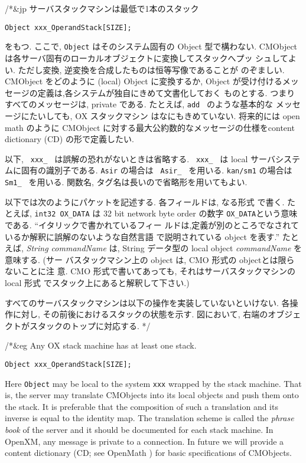 /*&jp
\noindent
サーバスタックマシンは最低で1本のスタック
\begin{verbatim}
Object xxx_OperandStack[SIZE];
\end{verbatim}
をもつ.  ここで, {\tt Object} はそのシステム固有の Object 型で構わない.
CMObject は各サーバ固有のローカルオブジェクトに変換してスタックへプッ
シュしてよい.  ただし変換, 逆変換を合成したものは恒等写像であることが
のぞましい.  CMObject をどのように (local) Object に変換するか, Object 
が受け付けるメッセージの定義は,各システムが独自にきめて文書化しておく
ものとする.  つまりすべてのメッセージは, private である.  たとえば,
{\tt add } のような基本的な メッセージにたいしても, OX スタックマシン
はなにもきめていない.  将来的には open math \cite{openmath} のように
CMObject に対する最大公約数的なメッセージの仕様をcontent dictionary
(CD) の形で定義したい.

以下, \verb+ xxx_ + は誤解の恐れがないときは省略する.
\verb+ xxx_ + は local サーバシステムに固有の識別子である.
{\tt Asir} の場合は \verb+ Asir_ + を用いる.  {\tt kan/sm1} の場合は 
\verb+ Sm1_ + を用いる.  関数名, タグ名は長いので省略形を用いてもよい.

以下では次のようにパケットを記述する.  各フィールドは,
 なる形式
で書く.  たとえば, {\tt int32 OX\_DATA} は 32 bit network byte order 
の数字 {\tt OX\_DATA}という意味である.  ``イタリックで書かれているフィー
ルドは,定義が別のところでなされているか解釈に誤解のないような自然言語
で説明されている object を表す.''  たとえば, {\it String commandName} 
は, String データ型の local object {\it commandName} を意味する.  (サー
バスタックマシン上の object は, CMO 形式の objectとは限らないことに注
意.  CMO 形式で書いてあっても, それはサーバスタックマシンのlocal 形式
でスタック上にあると解釈して下さい.)

すべてのサーバスタックマシンは以下の操作を実装していないといけない.
各操作に対し, その前後におけるスタックの状態を示す. 図において, 
右端のオブジェクトがスタックのトップに対応する. 
*/

/*&eg
\noindent
Any OX stack machine has at least one stack.
\begin{verbatim}
Object xxx_OperandStack[SIZE];
\end{verbatim}
Here {\tt Object} may be local to the system {\tt xxx} wrapped by the stack
machine. 
That is, the server may translate CMObjects into its local
objects and push them onto the stack.  It is preferable that
the composition of such a translation and its inverse is equal to the
identity map. The translation scheme is called the {\it phrase book} of the
server and it should be documented for each stack machine.  In OpenXM,
any message is private to a connection.  In future we will provide a content
dictionary (CD; see OpenMath \cite{openmath}) for basic specifications
of CMObjects.

